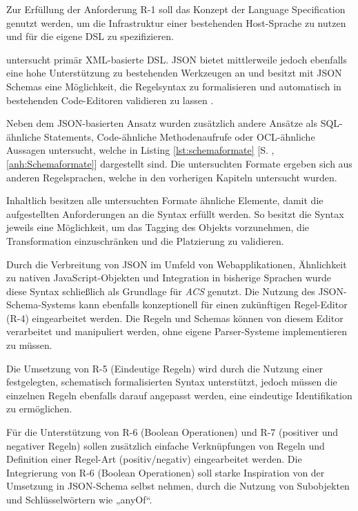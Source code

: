 \medskip

Zur Erfüllung der Anforderung R-1 soll das Konzept der Language Specification genutzt werden, um die Infrastruktur einer bestehenden Host-Sprache zu nutzen und für die eigene DSL zu spezifizieren. 

\textcite{mernikWhenHowDevelop2005} untersucht primär XML-basierte DSL. JSON bietet mittlerweile jedoch ebenfalls eine hohe Unterstützung zu bestehenden Werkzeugen an und besitzt mit JSON Schemas eine Möglichkeit, die Regelsyntax zu formalisieren und automatisch in bestehenden Code-Editoren validieren zu lassen \parencite{jsonschemaorganisationJSONSchema2025}.

Neben dem JSON-basierten Ansatz wurden zusätzlich andere Ansätze als SQL-ähnliche Statements, Code-ähnliche Methodenaufrufe oder OCL-ähnliche Aussagen untersucht, welche in Listing \ref{lst:schemaformate} [S. \pageref{lst:schemaformate}, \ref{anh:Schemaformate}] dargestellt sind. Die untersuchten Formate ergeben sich aus anderen Regelsprachen, welche in den vorherigen Kapiteln untersucht wurden.

Inhaltlich besitzen alle untersuchten Formate ähnliche Elemente, damit die aufgestellten Anforderungen an die Syntax erfüllt werden. So besitzt die Syntax jeweils eine Möglichkeit, um das Tagging des Objekts vorzunehmen, die Transformation einzuschränken und die Platzierung zu validieren. 

Durch die Verbreitung von JSON im Umfeld von Webapplikationen, Ähnlichkeit zu nativen JavaScript-Objekten und Integration in bisherige Sprachen wurde diese Syntax schließlich als Grundlage für \textit{ACS} genutzt. Die Nutzung des JSON-Schema-Systems kann ebenfalls konzeptionell für einen zukünftigen Regel-Editor (R-4) eingearbeitet werden. Die Regeln und Schemas können von diesem Editor verarbeitet und manipuliert werden, ohne eigene Parser-Systeme implementieren zu müssen.

\medskip

Die Umsetzung von R-5 (Eindeutige Regeln) wird durch die Nutzung einer festgelegten, schematisch formalisierten Syntax unterstützt, jedoch müssen die einzelnen Regeln ebenfalls darauf angepasst werden, eine eindeutige Identifikation zu ermöglichen.

\medskip

Für die Unterstützung von R-6 (Boolean Operationen) und R-7 (positiver und negativer Regeln) sollen zusätzlich einfache Verknüpfungen von Regeln und Definition einer Regel-Art (positiv/negativ) eingearbeitet werden. Die Integrierung von R-6 (Boolean Operationen) soll starke Inspiration von der Umsetzung in JSON-Schema selbst nehmen, durch die Nutzung von Subobjekten und Schlüsselwörtern wie „anyOf“.

